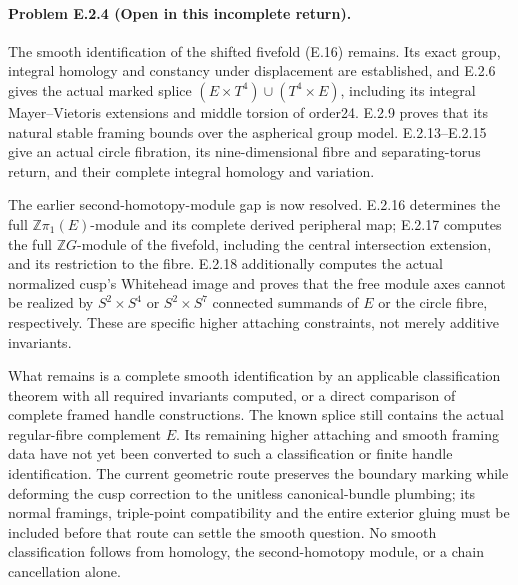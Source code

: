 \paragraph{Problem E.2.4 (Open in this incomplete return).}
The smooth identification of the shifted fivefold (E.16) remains.
Its exact group, integral homology and constancy under displacement
are established, and E.2.6 gives the actual marked splice
$(E\times T^4)\cup(T^4\times E)$, including its integral
Mayer--Vietoris extensions and middle torsion of order24.
E.2.9 proves that its natural stable framing bounds over the
aspherical group model. E.2.13--E.2.15 give an actual circle
fibration, its nine-dimensional fibre and separating-torus
return, and their complete integral homology and variation.

The earlier second-homotopy-module gap is now resolved.
E.2.16 determines the full $\mathbb Z\pi_1(E)$-module and its
complete derived peripheral map; E.2.17 computes the full
$\mathbb ZG$-module of the fivefold, including the central
intersection extension, and its restriction to the fibre.
E.2.18 additionally computes the actual normalized cusp's
Whitehead image and proves that the free module axes cannot
be realized by $S^2\times S^4$ or $S^2\times S^7$ connected
summands of $E$ or the circle fibre, respectively. These are
specific higher attaching constraints, not merely additive
invariants.

What remains is a complete smooth identification by an
applicable classification theorem with all required invariants
computed, or a direct comparison of complete framed handle
constructions. The known splice still contains the actual
regular-fibre complement $E$. Its remaining higher attaching
and smooth framing data have not yet been converted to such
a classification or finite handle identification. The current
geometric route preserves the boundary marking while deforming
the cusp correction to the unitless canonical-bundle plumbing;
its normal framings, triple-point compatibility and the entire
exterior gluing must be included before that route can settle
the smooth question. No smooth classification follows from
homology, the second-homotopy module, or a chain cancellation
alone.


